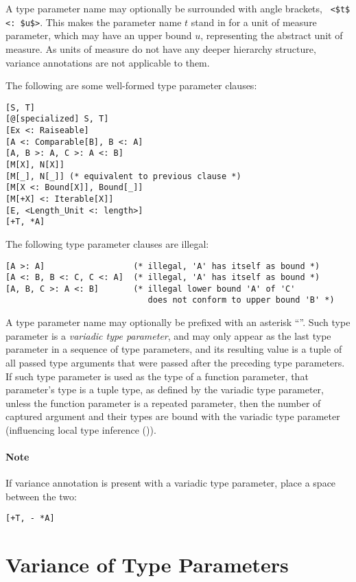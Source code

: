 A type parameter name may optionally be surrounded with angle brackets, ~\lstinline!<$t$ <: $u$>!. This makes the parameter name $t$ stand in for a unit of measure parameter, which may have an upper bound $u$, representing the abstract unit of measure. As units of measure do not have any deeper hierarchy structure, variance annotations are not applicable to them. 

\example The following are some well-formed type parameter clauses:
\begin{lstlisting}
[S, T]
[@[specialized] S, T]
[Ex <: Raiseable]
[A <: Comparable[B], B <: A]
[A, B >: A, C >: A <: B]
[M[X], N[X]]
[M[_], N[_]] (* equivalent to previous clause *)
[M[X <: Bound[X]], Bound[_]]
[M[+X] <: Iterable[X]]
[E, <Length_Unit <: length>]
[+T, *A]
\end{lstlisting}
The following type parameter clauses are illegal:
\begin{lstlisting}
[A >: A]                  (* illegal, 'A' has itself as bound *)
[A <: B, B <: C, C <: A]  (* illegal, 'A' has itself as bound *)
[A, B, C >: A <: B]       (* illegal lower bound 'A' of 'C'
                             does not conform to upper bound 'B' *)
\end{lstlisting}

A type parameter name may optionally be prefixed with an asterisk ``\code{*}''. Such type parameter is a {\em variadic type parameter}, and may only appear as the last type parameter in a sequence of type parameters, and its resulting value is a tuple of all passed type arguments that were passed after the preceding type parameters. If such type parameter is used as the type of a function parameter, that parameter's type is a tuple type, as defined by the variadic type parameter, unless the function parameter is a repeated parameter, then the number of captured argument and their types are bound with the variadic type parameter (influencing local type inference ()). 

\paragraph{Note}
If variance annotation is present with a variadic type parameter, place a space between the two:
\begin{lstlisting}
[+T, - *A]
\end{lstlisting}






\section{Variance of Type Parameters}
\label{sec:variance-of-type-parameters}

